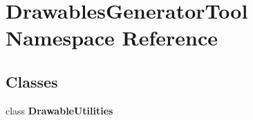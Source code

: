 \hypertarget{namespace_drawables_generator_tool}{}\section{Drawables\+Generator\+Tool Namespace Reference}
\label{namespace_drawables_generator_tool}
\subsection*{Classes}
\begin{DoxyCompactItemize}
\item 
class {\bfseries Drawable\+Utilities}
\end{DoxyCompactItemize}
